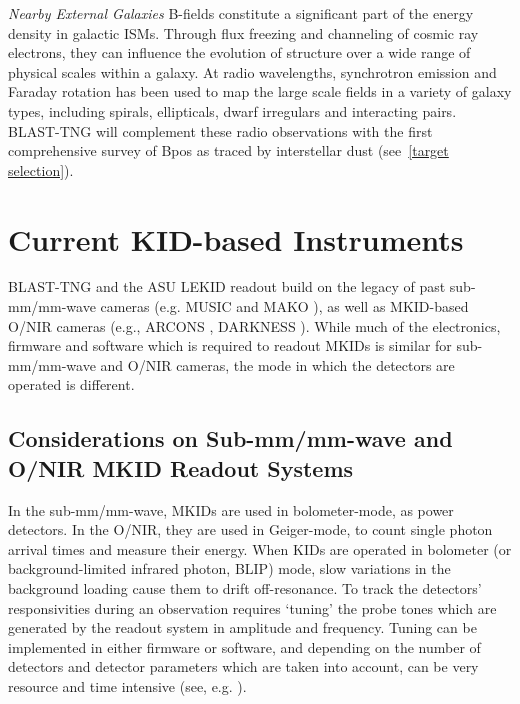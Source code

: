 \vspace{5mm}

\textit{Nearby External Galaxies} B-fields constitute a significant part of the energy density in galactic ISMs. Through flux freezing and channeling of cosmic ray electrons, they can influence the evolution of structure over a wide range of physical scales within a galaxy. At radio wavelengths, synchrotron emission and Faraday rotation has been used to map the large scale fields in a variety of galaxy types, including spirals, ellipticals, dwarf irregulars and interacting pairs. BLAST-TNG will complement these radio observations with the first comprehensive survey of \gls{Bpos} as traced by interstellar dust (see~\ref{target selection}).

\section{Current KID-based Instruments}\label{kid cameras}

BLAST-TNG and the ASU LEKID readout build on the legacy of past sub-mm/mm-wave cameras (e.g. MUSIC \citep{golwala2012status} and MAKO \citep{swenson2012mako}), as well as MKID-based O/NIR cameras (e.g., ARCONS \citep{mazin2013arcons}, DARKNESS \citep{meeker2018darkness,strader2016digitial}). While much of the electronics, firmware and software which is required to readout MKIDs is similar for sub-mm/mm-wave and O/NIR cameras, the mode in which the detectors are operated is different.

\subsection{Considerations on Sub-mm/mm-wave and O/NIR MKID Readout Systems}

In the sub-mm/mm-wave, MKIDs are used in bolometer-mode, as power detectors. In the O/NIR, they are used in Geiger-mode, to count single photon arrival times and measure their energy. When KIDs are operated in bolometer (or background-limited infrared photon, BLIP) mode, slow variations in the background loading cause them to drift off-resonance. To track the detectors' responsivities during an observation requires `tuning' the probe tones which are generated by the readout system in amplitude and frequency. Tuning can be implemented in either firmware or software, and depending on the number of detectors and detector parameters which are taken into account, can be very resource and time intensive (see, e.g. \citet{dodkins2018mkid}).

